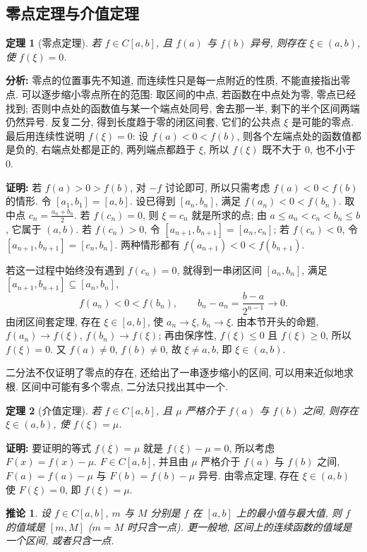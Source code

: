 \documentclass[UTF8,openany]{ctexbook}
\theoremstyle{chinesetextbook}
\newtheorem{theorem}{定理}[section]
\newenvironment{cnproof}{\par\indent\textbf{证明:} \ignorespaces}{\par}
\newtheorem*{corollarysingle}{推论}
\begin{document}
\subsection{零点定理与介值定理}
\begin{theorem}[零点定理]
若 $f\in C[a,b]$, 且 $f(a)$ 与 $f(b)$ 异号, 则存在 $\xi\in(a,b)$, 使 $f(\xi)=0$.
\end{theorem}
\par\indent\textbf{分析:} 零点的位置事先不知道, 而连续性只是每一点附近的性质, 不能直接指出零点. 可以逐步缩小零点所在的范围: 取区间的中点, 若函数在中点处为零, 零点已经找到; 否则中点处的函数值与某一个端点处同号, 舍去那一半, 剩下的半个区间两端仍然异号. 反复二分, 得到长度趋于零的闭区间套, 它们的公共点 $\xi$ 是可能的零点. 最后用连续性说明 $f(\xi)=0$: 设 $f(a)<0<f(b)$, 则各个左端点处的函数值都是负的, 右端点处都是正的, 两列端点都趋于 $\xi$, 所以 $f(\xi)$ 既不大于 $0$, 也不小于 $0$.
\begin{cnproof}
若 $f(a)>0>f(b)$, 对 $-f$ 讨论即可, 所以只需考虑 $f(a)<0<f(b)$ 的情形. 令 $[a_1,b_1]=[a,b]$. 设已得到 $[a_n,b_n]$, 满足 $f(a_n)<0<f(b_n)$. 取中点 $\displaystyle c_n=\frac{a_n+b_n}2$. 若 $f(c_n)=0$, 则 $\xi=c_n$ 就是所求的点; 由 $a\le a_n<c_n<b_n\le b$, 它属于 $(a,b)$. 若 $f(c_n)>0$, 令 $[a_{n+1},b_{n+1}]=[a_n,c_n]$; 若 $f(c_n)<0$, 令 $[a_{n+1},b_{n+1}]=[c_n,b_n]$. 两种情形都有 $f(a_{n+1})<0<f(b_{n+1})$.

若这一过程中始终没有遇到 $f(c_n)=0$, 就得到一串闭区间 $[a_n,b_n]$, 满足 $[a_{n+1},b_{n+1}]\subseteq[a_n,b_n]$,
\[
f(a_n)<0<f(b_n),\qquad b_n-a_n=\frac{b-a}{2^{n-1}}\to0.
\]
由闭区间套定理, 存在 $\xi\in[a,b]$, 使 $a_n\to\xi$, $b_n\to\xi$. 由本节开头的命题, $f(a_n)\to f(\xi)$, $f(b_n)\to f(\xi)$; 再由保序性, $f(\xi)\le0$ 且 $f(\xi)\ge0$, 所以 $f(\xi)=0$. 又 $f(a)\ne0$, $f(b)\ne0$, 故 $\xi\ne a,b$, 即 $\xi\in(a,b)$.
\end{cnproof}
二分法不仅证明了零点的存在, 还给出了一串逐步缩小的区间, 可以用来近似地求根. 区间中可能有多个零点, 二分法只找出其中一个.
\begin{theorem}[介值定理]
若 $f\in C[a,b]$, 且 $\mu$ 严格介于 $f(a)$ 与 $f(b)$ 之间, 则存在 $\xi\in(a,b)$, 使 $f(\xi)=\mu$.
\end{theorem}
\begin{cnproof}
要证明的等式 $f(\xi)=\mu$ 就是 $f(\xi)-\mu=0$, 所以考虑 $F(x)=f(x)-\mu$. $F\in C[a,b]$, 并且由 $\mu$ 严格介于 $f(a)$ 与 $f(b)$ 之间, $F(a)=f(a)-\mu$ 与 $F(b)=f(b)-\mu$ 异号. 由零点定理, 存在 $\xi\in(a,b)$ 使 $F(\xi)=0$, 即 $f(\xi)=\mu$.
\end{cnproof}
\begin{corollarysingle}
设 $f\in C[a,b]$, $m$ 与 $M$ 分别是 $f$ 在 $[a,b]$ 上的最小值与最大值, 则 $f$ 的值域是 $[m,M]$ ($m=M$ 时只含一点). 更一般地, 区间上的连续函数的值域是一个区间, 或者只含一点.
\end{corollarysingle}
\end{document}
